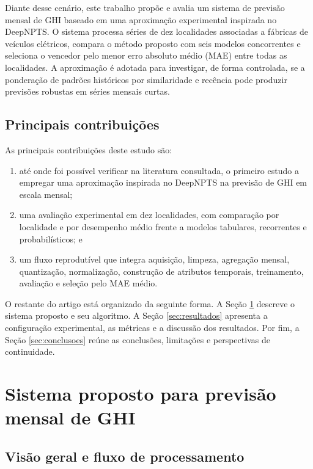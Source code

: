 \documentclass[11pt,a4paper]{article}
\newcounter{algoritmo}
\begin{document}
Diante desse cenário, este trabalho propõe e avalia um sistema de previsão mensal de GHI baseado em uma aproximação experimental inspirada no DeepNPTS. O sistema processa séries de dez localidades associadas a fábricas de veículos elétricos, compara o método proposto com seis modelos concorrentes e seleciona o vencedor pelo menor erro absoluto médio (MAE) entre todas as localidades. A aproximação é adotada para investigar, de forma controlada, se a ponderação de padrões históricos por similaridade e recência pode produzir previsões robustas em séries mensais curtas.

\subsection{Principais contribuições}

As principais contribuições deste estudo são:

\begin{enumerate}
\renewcommand{\labelenumi}{(\roman{enumi})}
\item até onde foi possível verificar na literatura consultada, o primeiro estudo a empregar uma aproximação inspirada no DeepNPTS na previsão de GHI em escala mensal;
\item uma avaliação experimental em dez localidades, com comparação por localidade e por desempenho médio frente a modelos tabulares, recorrentes e probabilísticos; e
\item um fluxo reprodutível que integra aquisição, limpeza, agregação mensal, quantização, normalização, construção de atributos temporais, treinamento, avaliação e seleção pelo MAE médio.
\end{enumerate}

O restante do artigo está organizado da seguinte forma. A Seção \ref{sec:sistema} descreve o sistema proposto e seu algoritmo. A Seção \ref{sec:resultados} apresenta a configuração experimental, as métricas e a discussão dos resultados. Por fim, a Seção \ref{sec:conclusoes} reúne as conclusões, limitações e perspectivas de continuidade.

\section{Sistema proposto para previsão mensal de GHI}
\label{sec:sistema}

\subsection{Visão geral e fluxo de processamento}
\end{document}
